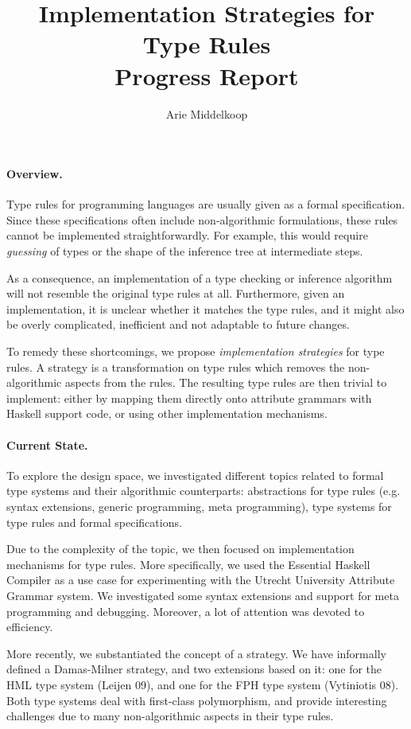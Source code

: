 \documentclass[a4paper]{article}
\title{Implementation Strategies for Type Rules\\Progress Report}
\author{Arie Middelkoop}
\begin{document}
\maketitle

\paragraph{Overview.}

Type rules for programming languages are usually given as a formal
specification.  Since these specifications often include
non-algorithmic formulations, these rules cannot be implemented
straightforwardly. For example, this would require \emph{guessing} of
types or the shape of the inference tree at intermediate steps. 

As a consequence, an implementation of a type checking or inference
algorithm will not resemble the original type rules at all.
Furthermore, given an implementation, it is unclear whether it matches
the type rules, and it might also be overly complicated, inefficient
and not adaptable to future changes.

To remedy these shortcomings, we propose \emph{implementation
  strategies} for type rules. A strategy is a transformation on type
rules which removes the non-algorithmic aspects from the rules. The
resulting type rules are then trivial to implement: either by mapping
them directly onto attribute grammars with Haskell support code, or
using other implementation mechanisms.

\paragraph{Current State.}

To explore the design space, we investigated different topics related
to formal type systems and their algorithmic counterparts:
abstractions for type rules (e.g. syntax extensions, generic
programming, meta programming), type systems for type rules and formal
specifications.
 
Due to the complexity of the topic, we then focused on implementation
mechanisms for type rules. More specifically, we used the Essential
Haskell Compiler as a use case for experimenting with the Utrecht
University Attribute Grammar system. We investigated some syntax
extensions and support for meta programming and debugging. Moreover, a
lot of attention was devoted to efficiency.

More recently, we substantiated the concept of a strategy. We have
informally defined a Damas-Milner strategy, and two extensions based
on it: one for the HML type system (Leijen 09), and one for the FPH
type system (Vytiniotis 08). Both type systems deal with first-class
polymorphism, and provide interesting challenges due to many non-algorithmic
aspects in their type rules.
\end{document}
